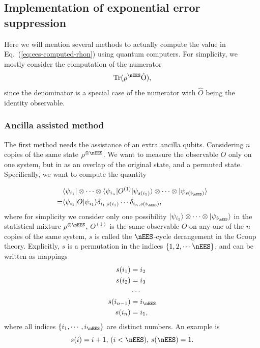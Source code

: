 \subsection{Implementation of exponential error suppression}
\label{sec:derangement-details}

Here we will mention several methods to actually compute the value in Eq.~(\ref{eq:ees-computed-rhon}) using quantum computers. For simplicity, we mostly consider the computation of the numerator
\begin{equation}
    \label{eq:ees-numerator}
    \mathrm{Tr( \rho^{\nEES} \hat{O})},
\end{equation}
since the denominator is a special case of the numerator with $\hat{O}$ being the identity observable.

\subsubsection{Ancilla assisted method}
\label{sec:derangement-details_ancilla-assisted}
The first method needs the assistance of an extra ancilla qubits. Considering
$n$ copies of the same state $\rho^{\otimes \nEES}$. We want to measure the observable $O$ only on one system, but
in as an overlap of the original state, and a permuted state. Specifically, we want to compute the quantity

\begin{equation}
    \label{eq:ees-single1}
    \begin{aligned}
          & \langle \psi _{i_1} |\otimes \cdots \otimes \langle \psi _{i_n} |O^{( 1)} |\psi _{s ( i_{1})} \rangle \otimes \cdots \otimes |\psi _{s ( i_{\nEES})} \rangle \\
        = & \langle \psi _{i_{1}} |O|\psi _{i_{1}} \rangle \delta _{i_{1} ,s ( i_{1})} \cdots \delta _{i_{n} ,s ( i_{\nEES})},
    \end{aligned}
\end{equation}
where for simplicity we consider only one possibility
$|\psi _{i_1} \rangle\otimes \cdots \otimes |\psi _{i_\nEES}\rangle$ in the
statistical mixture $\rho^{\otimes \nEES}$,
$O^{(1)}$ is the same observable $O$ on any one of the $n$ copies of the same system,
$s$ is called the $\nEES$-cycle derangement in the Group theory. Explicitly, $s$ is a permutation in the indices $\{1,2,\cdots \nEES\}$, and can be written as mappings
\begin{equation}
    \label{eq:ees-VD-ncycle}
    \begin{aligned}
        s( i_{1})   & =i_{2}\\
        s( i_{2})   & =i_{3}   \\
                    & \cdots   \\
        s( i_{n-1}) & =i_{\nEES}   \\
        s( i_{n})   & =i_{1} ,
    \end{aligned}
\end{equation}
where all indices $\{i_1,\cdots,i_\nEES\}$ are distinct numbers. An example is
\begin{equation}
    \label{eq:ees-cycle-all}
    s(i) = i+1,\,(i< \nEES),\, s(\nEES) = 1.
\end{equation}

